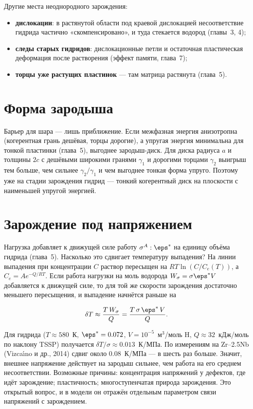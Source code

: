 
Другие места неоднородного зарождения:
\begin{itemize}
\item \textbf{дислокации}: в растянутой области под краевой дислокацией несоответствие гидрида частично
  «скомпенсировано», и туда стекается водород (главы~3, 4);
\item \textbf{следы старых гидридов}: дислокационные петли и остаточная пластическая деформация после растворения
  (эффект памяти, глава~7);
\item \textbf{торцы уже растущих пластинок} --- там матрица растянута (глава~5).
\end{itemize}

\section{Форма зародыша}

Барьер для шара --- лишь приближение. Если межфазная энергия анизотропна (когерентная грань дешёвая, торцы
дорогие), а упругая энергия минимальна для тонкой пластинки (глава~5), выгоднее зародыш-диск. Для диска радиуса $a$
и толщины $2c$ с дешёвыми широкими гранями $\gamma_1$ и дорогими торцами $\gamma_2$ выигрыш тем больше, чем
сильнее $\gamma_2/\gamma_1$ и чем выгоднее тонкая форма упруго. Поэтому уже на стадии зарождения гидрид ---
тонкий когерентный диск на плоскости с наименьшей упругой энергией.

\section{Зарождение под напряжением}

Нагрузка добавляет к движущей силе работу $\sigma^A:\eps^*$ на единицу объёма гидрида (глава~5). Насколько это
сдвигает температуру выпадения? На линии выпадения при концентрации $C$ раствор пересыщен на
$RT\ln(C/C_e(T))$, а $C_e = Ae^{-Q/RT}$. Если работа нагрузки на моль водорода $W_\sigma = \sigma\eps^*V$
добавляется к движущей силе, то для той же скорости зарождения достаточно меньшего пересыщения, и выпадение
начнётся раньше на
\begin{keyf}
\[
\delta T \approx \frac{T\,W_\sigma}{Q} = \frac{T\,\sigma\,\eps^*\,V}{Q}.
\]
\end{keyf}
Для гидрида ($T\approx580$~К, $\eps^* = 0.072$, $V = 10^{-5}$~м$^3$/моль H, $Q\approx32$~кДж/моль по наклону TSSP)
получается $\delta T/\sigma\approx0.013$~К/МПа. По измерениям на Zr--2.5Nb (Vizca\'{\i}no и др., 2014) сдвиг около
0.08~К/МПа --- в шесть раз больше. Значит, внешнее напряжение действует на зародыш сильнее, чем работа на его
среднем несоответствии. Возможные причины: концентрация напряжений у дефектов, где идёт зарождение;
пластичность; многоступенчатая природа зарождения. Это открытый вопрос, и в модели он отражён отдельным
параметром связи напряжений с зарождением.

